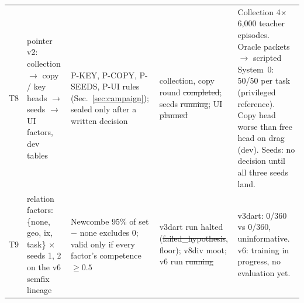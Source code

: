 \documentclass[10pt,twocolumn]{article}
\begin{document}
\begin{table}[t]
\begin{tabularx}{\textwidth}{@{}l>{\raggedright\arraybackslash}p{3.2cm}>{\raggedright\arraybackslash}p{4.1cm}>{\raggedright\arraybackslash}p{2.9cm}>{\raggedright\arraybackslash}X@{}}
\addlinespace
T8 & pointer v2: collection $\to$ copy / key heads $\to$ seeds $\to$ UI factors, dev tables &
P-KEY, P-COPY, P-SEEDS, P-UI rules (Sec.~\ref{sec:campaign}); sealed only after a written decision &
collection, copy round \st{completed}; seeds \st{running}; UI \st{planned} &
Collection 4$\times$6{,}000 teacher episodes. Oracle packets $\to$ scripted System~0: 50/50 per task (privileged reference). Copy head worse than free head on drag (dev). Seeds: no decision until all three seeds land. \\
\addlinespace
T9 & relation factors: \{none, geo, ix, task\} $\times$ seeds 1, 2 on the v6 semfix lineage &
Newcombe 95\% of set $-$ none excludes 0; valid only if every factor's competence $\ge0.5$ &
v3dart run halted (\st{failed\_hypothesis}, floor); v8div moot; v6 run \st{running} &
v3dart: 0/360 vs 0/360, uninformative. v6: training in progress, no evaluation yet. \\
\bottomrule
\end{tabularx}
\end{table}


\end{document}
